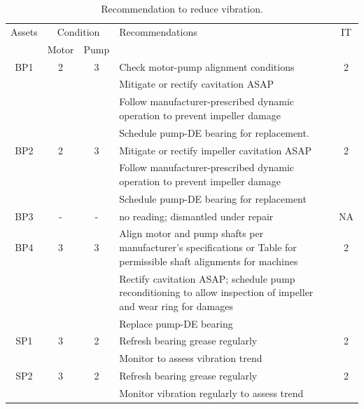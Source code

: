 \begin{table}[!h]
	\caption{Recommendation to reduce vibration.}
	\label{ch05_tbl_vibrationre}
	{\footnotesize
		\begin{tabular}{l|l|l|p{8cm}|c}
\hline
\multicolumn{1}{c|}{Assets} & \multicolumn{2}{c|}{Condition} & Recommendations & IT \\ 
\cline{2-3}
\multicolumn{1}{c|}{} & \multicolumn{1}{c|}{Motor} & \multicolumn{1}{c|}{Pump} & \multicolumn{1}{c|}{} &  \\ 
\hline
\multicolumn{1}{c|}{BP1} & \multicolumn{1}{c|}{2} & \multicolumn{1}{c|}{3} & Check motor-pump alignment conditions & 2 \\ 
\multicolumn{1}{c|}{} & \multicolumn{1}{c|}{} & \multicolumn{1}{c|}{} & Mitigate or rectify cavitation ASAP &  \\ 
\multicolumn{1}{c|}{} & \multicolumn{1}{c|}{} & \multicolumn{1}{c|}{} & Follow manufacturer-prescribed dynamic operation to prevent impeller damage &  \\ 
\multicolumn{1}{c|}{} & \multicolumn{1}{c|}{} & \multicolumn{1}{c|}{} & Schedule pump-DE bearing for replacement. &  \\ 
\hline
\multicolumn{1}{c|}{BP2} & \multicolumn{1}{c|}{2} & \multicolumn{1}{c|}{3} & Mitigate or rectify impeller cavitation ASAP & 2 \\ 
\multicolumn{1}{c|}{} & \multicolumn{1}{c|}{} & \multicolumn{1}{c|}{} & Follow manufacturer-prescribed dynamic operation to prevent impeller damage &  \\ 
\multicolumn{1}{c|}{} & \multicolumn{1}{c|}{} & \multicolumn{1}{c|}{} & Schedule pump-DE bearing for replacement &  \\ 
\hline
\multicolumn{1}{c|}{BP3} & \multicolumn{1}{c|}{-} & \multicolumn{1}{c|}{-} & no reading; dismantled under repair & NA \\ 
\hline
\multicolumn{1}{c|}{BP4} & \multicolumn{1}{c|}{3} & \multicolumn{1}{c|}{3} & Align motor and pump shafts per manufacturer’s specifications or Table for permissible shaft alignments for machines & 2 \\ 
\multicolumn{1}{c|}{} & \multicolumn{1}{c|}{} & \multicolumn{1}{c|}{} & Rectify cavitation ASAP;  schedule pump reconditioning to allow inspection of impeller and wear ring for damages &  \\ 
\multicolumn{1}{c|}{} & \multicolumn{1}{c|}{} & \multicolumn{1}{c|}{} & Replace pump-DE bearing &  \\ 
\hline
\multicolumn{1}{c|}{SP1} & \multicolumn{1}{c|}{3} & \multicolumn{1}{c|}{2} & Refresh bearing grease regularly & 2 \\ 
\multicolumn{1}{c|}{} & \multicolumn{1}{c|}{} & \multicolumn{1}{c|}{} & Monitor to assess vibration trend &  \\ 
\hline
\multicolumn{1}{c|}{SP2} & \multicolumn{1}{c|}{3} & \multicolumn{1}{c|}{2} & Refresh bearing grease regularly & 2 \\ 
\multicolumn{1}{c|}{} & \multicolumn{1}{c|}{} & \multicolumn{1}{c|}{} & Monitor vibration regularly to assess trend &  \\ 
\hline
\end{tabular}

	}
\end{table}


